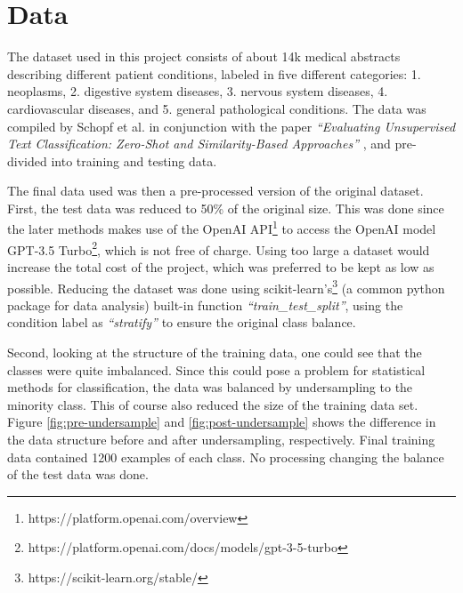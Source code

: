 \section{Data}
\label{sec:data}


The dataset used in this project consists of about 14k medical abstracts describing different patient conditions, labeled in five different categories: 1. neoplasms, 2. digestive system diseases, 3. nervous system diseases, 4. cardiovascular diseases, and 5. general pathological conditions. The data was compiled by Schopf et al. in conjunction with the paper \textit{“Evaluating Unsupervised Text Classification: Zero-Shot and Similarity-Based Approaches”} \cite{Schopf2022EvaluatingApproaches}, and pre-divided into training and testing data. 

The final data used was then a pre-processed version of the original dataset. First, the test data was reduced to 50\% of the original size. This was done since the later methods makes use of the OpenAI API\footnote{https://platform.openai.com/overview} to access the OpenAI model GPT-3.5 Turbo\footnote{https://platform.openai.com/docs/models/gpt-3-5-turbo}, which is not free of charge. Using too large a dataset would increase the total cost of the project, which was preferred to be kept as low as possible. Reducing the dataset was done using scikit-learn's\footnote{https://scikit-learn.org/stable/} (a common python package for data analysis) built-in function \textit{“train\_test\_split”}, using the condition label as \textit{“stratify”} to ensure the original class balance.

Second, looking at the structure of the training data, one could see that the classes were quite imbalanced. Since this could pose a problem for statistical methods for classification, the data was balanced by undersampling to the minority class. This of course also reduced the size of the training data set. Figure \ref{fig:pre-undersample} and \ref{fig:post-undersample} shows the difference in the data structure before and after undersampling, respectively. Final training data contained 1200 examples of each class. No processing changing the balance of the test data was done.

